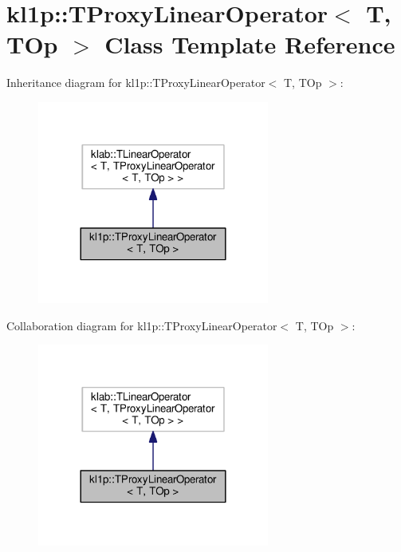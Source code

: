 \hypertarget{classkl1p_1_1TProxyLinearOperator}{}\section{kl1p\+:\+:T\+Proxy\+Linear\+Operator$<$ T, T\+Op $>$ Class Template Reference}
\label{classkl1p_1_1TProxyLinearOperator}


Inheritance diagram for kl1p\+:\+:T\+Proxy\+Linear\+Operator$<$ T, T\+Op $>$\+:
\nopagebreak
\begin{figure}[H]
\begin{center}
\leavevmode
\includegraphics[width=216pt]{classkl1p_1_1TProxyLinearOperator__inherit__graph}
\end{center}
\end{figure}


Collaboration diagram for kl1p\+:\+:T\+Proxy\+Linear\+Operator$<$ T, T\+Op $>$\+:
\nopagebreak
\begin{figure}[H]
\begin{center}
\leavevmode
\includegraphics[width=216pt]{classkl1p_1_1TProxyLinearOperator__coll__graph}
\end{center}
\end{figure}
